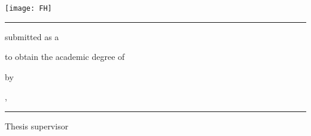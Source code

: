 \makeatletter
	\begin{titlepage}
		\centering
		\texttt{[image: FH]} \par
			\vskip 6mm
		\textsc{\Large \@coursetype}
			\vskip 2mm
		{\Large \@course}
			\vskip 0mm

		\rule{15cm}{0.3mm}

			\vfill
        {\bfseries\LARGE \@title\par}   %
			\vfill

		submitted as a \textsc{\@doctype}
			\vskip 2mm

		to obtain the academic degree of
			\vskip 6mm
		\@degree
			\vskip 6mm

		by
			\vskip 6mm
		{\bfseries\large \@author\par}
			\vskip 6mm

		\@location, {\large \@submonth\ \@subyear}
			\vskip 6mm

		\rule{15cm}{0.3mm}
			\vskip 5mm
		Thesis supervisor
			\vskip 0mm
		\@supervisor
	\end{titlepage}
\makeatother